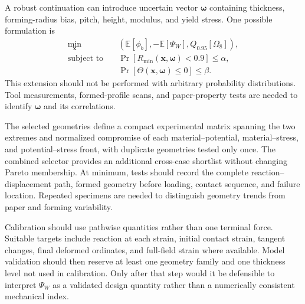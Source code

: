 \documentclass[11pt]{article}
\newcommand{\Rmin}{R_{\min}}
\newcommand{\phib}{\phi_{b}}
\newcommand{\PsiW}{\Psi_{W}}
\newcommand{\Om}{\Omega_{8}}
\begin{document}
A robust continuation can introduce uncertain vector $\bm\omega$ containing thickness, forming-radius bias, pitch, height, modulus, and yield stress. One possible formulation is
\begin{align}
\min_{\bm x}\quad &\left(
\mathbb E[\phib],
-\mathbb E[\PsiW],
Q_{0.95}[\Om]
\right),\\
\text{subject to}\quad
&\Pr[\Rmin(\bm x,\bm\omega)<0.9]\le\alpha,\\
&\Pr[\Theta(\bm x,\bm\omega)\le0]\le\beta.
\end{align}
This extension should not be performed with arbitrary probability distributions. Tool measurements, formed-profile scans, and paper-property tests are needed to identify $\bm\omega$ and its correlations.

The selected geometries define a compact experimental matrix spanning the two extremes and normalized compromise of each material--potential, material--stress, and potential--stress front, with duplicate geometries tested only once. The combined selector provides an additional cross-case shortlist without changing Pareto membership. At minimum, tests should record the complete reaction--displacement path, formed geometry before loading, contact sequence, and failure location. Repeated specimens are needed to distinguish geometry trends from paper and forming variability.

Calibration should use pathwise quantities rather than one terminal force. Suitable targets include reaction at each strain, initial contact strain, tangent changes, final deformed ordinates, and full-field strain where available. Model validation should then reserve at least one geometry family and one thickness level not used in calibration. Only after that step would it be defensible to interpret $\PsiW$ as a validated design quantity rather than a numerically consistent mechanical index.

\FloatBarrier



\end{document}
